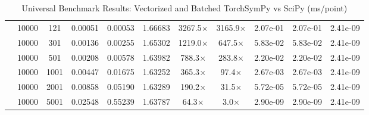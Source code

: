 \begin{table}[h]
{\begin{tabular}{l c c c c c c c c c c}
\hline
{} & 10000 & 121 & 0.00051 & 0.00053 & 1.66683 & 3267.5$\times$ & 3165.9$\times$ & 2.07e-01 & 2.07e-01 & 2.41e-09 \\
 & 10000 & 301 & 0.00136 & 0.00255 & 1.65302 & 1219.0$\times$ & 647.5$\times$ & 5.83e-02 & 5.83e-02 & 2.41e-09 \\
 & 10000 & 501 & 0.00208 & 0.00578 & 1.63982 & 788.3$\times$ & 283.8$\times$ & 2.20e-02 & 2.20e-02 & 2.41e-09 \\
 & 10000 & 1001 & 0.00447 & 0.01675 & 1.63252 & 365.3$\times$ & 97.4$\times$ & 2.67e-03 & 2.67e-03 & 2.41e-09 \\
 & 10000 & 2001 & 0.00858 & 0.05190 & 1.63289 & 190.2$\times$ & 31.5$\times$ & 5.72e-05 & 5.72e-05 & 2.41e-09 \\
 & 10000 & 5001 & 0.02548 & 0.55239 & 1.63787 & 64.3$\times$ & 3.0$\times$ & 2.90e-09 & 2.90e-09 & 2.41e-09 \\
\bottomrule
\end{tabular}
}
\caption{Universal Benchmark Results: Vectorized and Batched TorchSymPy vs SciPy (ms/point)}
\label{tab:universal_benchmark}
\end{table}